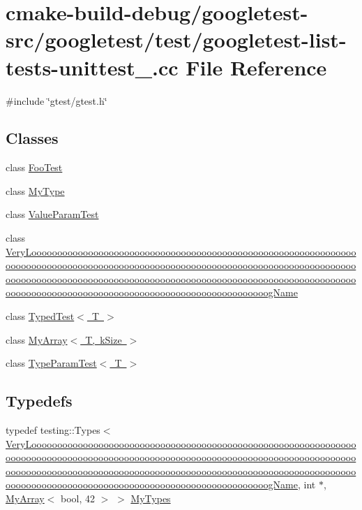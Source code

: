 \hypertarget{googletest-list-tests-unittest___8cc}{}\section{cmake-\/build-\/debug/googletest-\/src/googletest/test/googletest-\/list-\/tests-\/unittest\+\_\+.cc File Reference}
\label{googletest-list-tests-unittest___8cc}
{\ttfamily \#include \char`\"{}gtest/gtest.\+h\char`\"{}}\newline
\subsection*{Classes}
\begin{DoxyCompactItemize}
\item 
class \mbox{\hyperlink{classFooTest}{Foo\+Test}}
\item 
class \mbox{\hyperlink{classMyType}{My\+Type}}
\item 
class \mbox{\hyperlink{classValueParamTest}{Value\+Param\+Test}}
\item 
class \mbox{\hyperlink{classVeryLoooooooooooooooooooooooooooooooooooooooooooooooooooooooooooooooooooooooooooooooooooooo72732a7a8cd04f0ab9551a6aaa86a0c2}{Very\+Loooooooooooooooooooooooooooooooooooooooooooooooooooooooooooooooooooooooooooooooooooooooooooooooooooooooooooooooooooooooooooooooooooooooooooooooooooooooooooooooooooooooooooooooooooooooooooooooooooooooooooooooooooooooooooooooooooooooooooooooooooooooooog\+Name}}
\item 
class \mbox{\hyperlink{classTypedTest}{Typed\+Test$<$ T $>$}}
\item 
class \mbox{\hyperlink{classMyArray}{My\+Array$<$ T, k\+Size $>$}}
\item 
class \mbox{\hyperlink{classTypeParamTest}{Type\+Param\+Test$<$ T $>$}}
\end{DoxyCompactItemize}
\subsection*{Typedefs}
\begin{DoxyCompactItemize}
\item 
typedef testing\+::\+Types$<$ \mbox{\hyperlink{classVeryLoooooooooooooooooooooooooooooooooooooooooooooooooooooooooooooooooooooooooooooooooooooo72732a7a8cd04f0ab9551a6aaa86a0c2}{Very\+Loooooooooooooooooooooooooooooooooooooooooooooooooooooooooooooooooooooooooooooooooooooooooooooooooooooooooooooooooooooooooooooooooooooooooooooooooooooooooooooooooooooooooooooooooooooooooooooooooooooooooooooooooooooooooooooooooooooooooooooooooooooooooog\+Name}}, int $\ast$, \mbox{\hyperlink{classMyArray}{My\+Array}}$<$ bool, 42 $>$ $>$ \mbox{\hyperlink{googletest-list-tests-unittest___8cc_a16f58cd49c18568802322bbaf9f3f654}{My\+Types}}
\end{DoxyCompactItemize}
